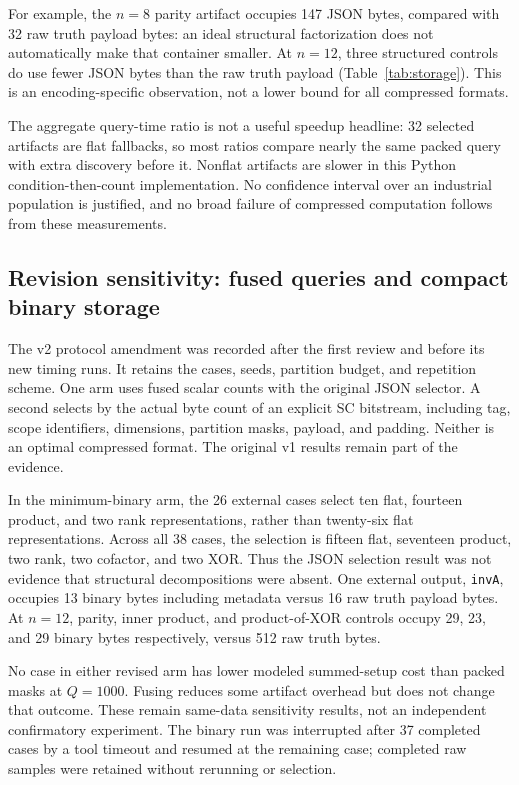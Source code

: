 \documentclass[11pt]{article}
\theoremstyle{definition}\newtheorem{definition}[theorem]{Definition}
\theoremstyle{remark}\newtheorem{remark}[theorem]{Remark}
\begin{document}
For example, the $n=8$ parity artifact occupies 147 JSON bytes, compared with 32 raw truth payload bytes: an ideal structural factorization does not automatically make that container smaller. At $n=12$, three structured controls do use fewer JSON bytes than the raw truth payload (Table~\ref{tab:storage}). This is an encoding-specific observation, not a lower bound for all compressed formats.

The aggregate query-time ratio is not a useful speedup headline: 32 selected artifacts are flat fallbacks, so most ratios compare nearly the same packed query with extra discovery before it. Nonflat artifacts are slower in this Python condition-then-count implementation. No confidence interval over an industrial population is justified, and no broad failure of compressed computation follows from these measurements.


\subsection{Revision sensitivity: fused queries and compact binary storage}
The v2 protocol amendment was recorded after the first review and before its new timing runs. It retains the cases, seeds, partition budget, and repetition scheme. One arm uses fused scalar counts with the original JSON selector. A second selects by the actual byte count of an explicit SC bitstream, including tag, scope identifiers, dimensions, partition masks, payload, and padding. Neither is an optimal compressed format. The original v1 results remain part of the evidence.

In the minimum-binary arm, the 26 external cases select ten flat, fourteen product, and two rank representations, rather than twenty-six flat representations. Across all 38 cases, the selection is fifteen flat, seventeen product, two rank, two cofactor, and two XOR. Thus the JSON selection result was not evidence that structural decompositions were absent. One external output, \texttt{invA}, occupies 13 binary bytes including metadata versus 16 raw truth payload bytes. At $n=12$, parity, inner product, and product-of-XOR controls occupy 29, 23, and 29 binary bytes respectively, versus 512 raw truth bytes.

No case in either revised arm has lower modeled summed-setup cost than packed masks at $Q=1000$. Fusing reduces some artifact overhead but does not change that outcome. These remain same-data sensitivity results, not an independent confirmatory experiment. The binary run was interrupted after 37 completed cases by a tool timeout and resumed at the remaining case; completed raw samples were retained without rerunning or selection.
\end{document}
